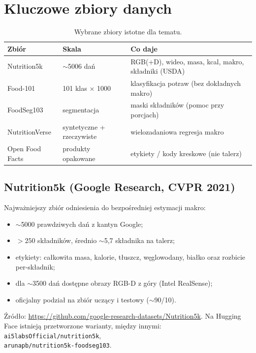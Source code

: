\documentclass[11pt,a4paper]{article}
\begin{document}
\section{Kluczowe zbiory danych}

\begin{table}[H]
\centering
\caption{Wybrane zbiory istotne dla tematu.}
\label{tab:datasets}
\begin{tabular}{@{}llp{6.2cm}@{}}
\toprule
\textbf{Zbiór} & \textbf{Skala} & \textbf{Co daje} \\
\midrule
Nutrition5k & $\sim$5006 dań & RGB(+D), wideo, masa, kcal, makro, składniki (USDA) \\
Food-101 & 101 klas $\times$ 1000 & klasyfikacja potraw (bez dokładnych makro) \\
FoodSeg103 & segmentacja & maski składników (pomoc przy porcjach) \\
NutritionVerse & syntetyczne + rzeczywiste & wielozadaniowa regresja makro \\
Open Food Facts & produkty opakowane & etykiety / kody kreskowe (nie talerz) \\
\bottomrule
\end{tabular}
\end{table}

\subsection{Nutrition5k (Google Research, CVPR 2021)}
Najważniejszy zbiór odniesienia do bezpośredniej estymacji makro:
\begin{itemize}[leftmargin=*]
  \item $\sim$5000 prawdziwych dań z kantyn Google;
  \item $>250$ składników, średnio $\sim$5{,}7 składnika na talerz;
  \item etykiety: całkowita masa, kalorie, tłuszcz, węglowodany, białko
        oraz rozbicie per-składnik;
  \item dla $\sim$3500 dań dostępne obrazy RGB-D z góry (Intel RealSense);
  \item oficjalny podział na zbiór uczący i testowy ($\sim$90/10).
\end{itemize}
Źródło: \url{https://github.com/google-research-datasets/Nutrition5k}.
Na Hugging Face istnieją przetworzone warianty, między innymi:
\texttt{ai5labsOfficial/nutrition5k},\\
\texttt{arunapb/nutrition5k-foodseg103}.
\end{document}
